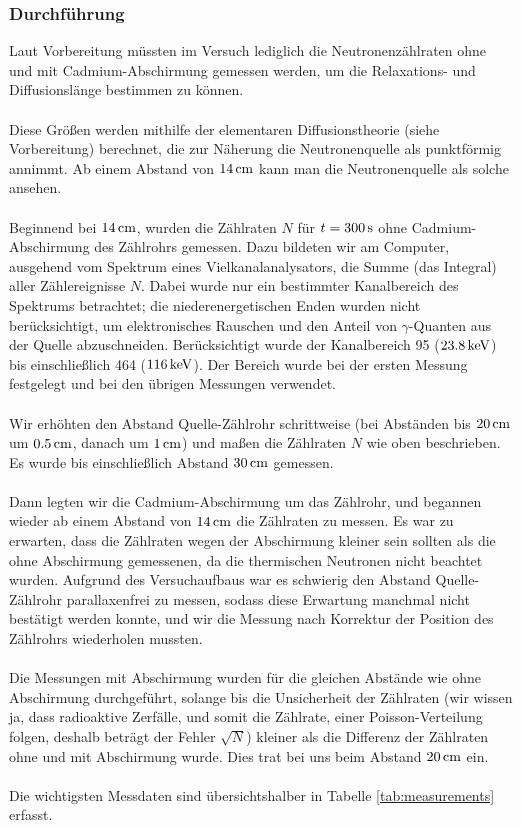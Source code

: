 \documentclass[a4paper,titlepage]{scrartcl}
\numberwithin{equation}{section}
\begin{document}
\subsubsection{Durchführung}
Laut Vorbereitung müssten im Versuch lediglich die Neutronenzählraten ohne und mit Cadmium-Abschirmung gemessen werden, um die Relaxations- und Diffusionslänge bestimmen zu können.\\ \\
Diese Größen werden mithilfe der elementaren Diffusionstheorie (siehe Vorbereitung) berechnet, die zur Näherung die Neutronenquelle als punktförmig annimmt. Ab einem Abstand von $\unit[14]{cm}$ kann man die Neutronenquelle als solche ansehen.\\ \\
Beginnend bei $\unit[14]{cm}$, wurden die Zählraten $N$ für $t=\unit[300]{s}$ ohne Cadmium-Abschirmung des Zählrohrs gemessen. Dazu bildeten wir am Computer, ausgehend vom Spektrum eines Vielkanalanalysators, die Summe (das Integral) aller Zählereignisse $N$. Dabei wurde nur ein bestimmter Kanalbereich des Spektrums betrachtet; die niederenergetischen Enden wurden nicht berücksichtigt, um elektronisches Rauschen und den Anteil von $\gamma$-Quanten aus der Quelle abzuschneiden. Berücksichtigt wurde der Kanalbereich 95 ($\unit[23.8]{keV}$) bis einschließlich 464 ($\unit[116]{keV}$). Der Bereich wurde bei der ersten Messung festgelegt und bei den übrigen Messungen verwendet.\\ \\
Wir erhöhten den Abstand Quelle-Zählrohr schrittweise (bei Abständen bis $\unit[20]{cm}$ um $\unit[0.5]{cm}$, danach um $\unit[1]{cm}$) und maßen die Zählraten $N$ wie oben beschrieben. Es wurde bis einschließlich Abstand $\unit[30]{cm}$ gemessen.\\ \\
Dann legten wir die Cadmium-Abschirmung um das Zählrohr, und begannen wieder ab einem Abstand von $\unit[14]{cm}$ die Zählraten zu messen. Es war zu erwarten, dass die Zählraten wegen der Abschirmung kleiner sein sollten als die ohne Abschirmung gemessenen, da die thermischen Neutronen nicht beachtet wurden. Aufgrund des Versuchaufbaus war es schwierig den Abstand Quelle-Zählrohr parallaxenfrei zu messen, sodass diese Erwartung manchmal nicht bestätigt werden konnte, und wir die Messung nach Korrektur der Position des Zählrohrs wiederholen mussten.\\ \\
Die Messungen mit Abschirmung wurden für die gleichen Abstände wie ohne Abschirmung durchgeführt, solange bis die Unsicherheit der Zählraten (wir wissen ja, dass radioaktive Zerfälle, und somit die Zählrate, einer Poisson-Verteilung folgen, deshalb beträgt der Fehler $\sqrt{N}$) kleiner als die Differenz der Zählraten ohne und mit Abschirmung wurde. Dies trat bei uns beim Abstand $\unit[20]{cm}$ ein.\\ \\
Die wichtigsten Messdaten sind übersichtshalber in Tabelle \ref{tab:measurements} erfasst.
\end{document}
